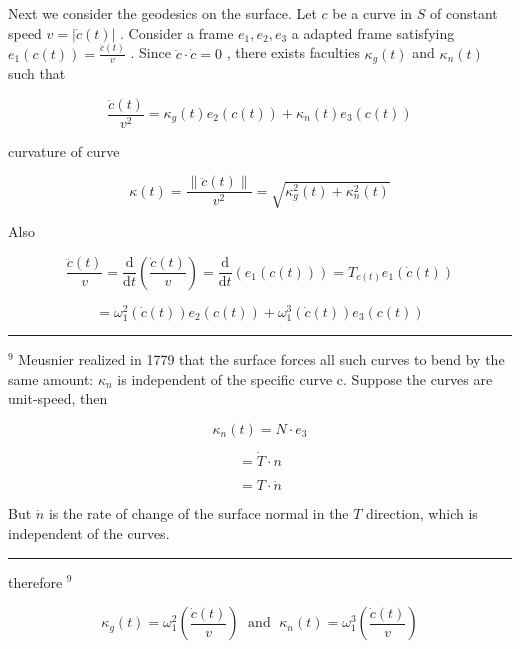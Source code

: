 \documentclass[lang=cn,a4paper,11pt,openany,twoside]{elegantbook}
\newcommand{\HRule}{\begin{center}\rule{0.9\linewidth}{0.2mm}\end{center}}
\begin{document}
Next we consider the geodesics on the surface. Let \(c\) be a curve in \(S\) of constant speed \(v = \left| {\dot{c}\left( t\right) }\right|\) . Consider a frame \({e}_{1},{e}_{2},{e}_{3}\) a adapted frame satisfying \({e}_{1}\left( {c\left( t\right) }\right)  = \frac{\dot{c}\left( t\right) }{v}\) . Since \(\ddot{c} \cdot  \dot{c} = 0\) , there exists faculties \({\kappa }_{g}\left( t\right)\) and \({\kappa }_{n}\left( t\right)\) such that

\[
\frac{\ddot{c}\left( t\right) }{{v}^{2}} = {\kappa }_{g}\left( t\right) {e}_{2}\left( {c\left( t\right) }\right)  + {\kappa }_{n}\left( t\right) {e}_{3}\left( {c\left( t\right) }\right)
\]

curvature of curve

\[
\kappa \left( t\right)  = \frac{\parallel \ddot{c}\left( t\right) \parallel }{{v}^{2}} = \sqrt{{\kappa }_{g}^{2}\left( t\right)  + {\kappa }_{n}^{2}\left( t\right) }
\]

Also

\[
\frac{\ddot{c}\left( t\right) }{v} = \frac{\mathrm{d}}{\mathrm{d}t}\left( \frac{\dot{c}\left( t\right) }{v}\right)  = \frac{\mathrm{d}}{\mathrm{d}t}\left( {{e}_{1}\left( {c\left( t\right) }\right) }\right)  = {T}_{c\left( t\right) }{e}_{1}\left( {\dot{c}\left( t\right) }\right)
\]

\[
= {\omega }_{1}^{2}\left( {\dot{c}\left( t\right) }\right) {e}_{2}\left( {c\left( t\right) }\right)  + {\omega }_{1}^{3}\left( {\dot{c}\left( t\right) }\right) {e}_{3}\left( {c\left( t\right) }\right)
\]

\HRule

\({}^{9}\) Meusnier realized in 1779 that the surface forces all such curves to bend by the same amount: \({\kappa }_{n}\) is independent of the specific curve c. Suppose the curves are unit-speed, then

\[
{\kappa }_{n}\left( t\right)  = N \cdot  {e}_{3}
\]

\[
= \dot{T} \cdot  n
\]

\[
= T \cdot  \dot{n}
\]

But \(\dot{n}\) is the rate of change of the surface normal in the \(T\) direction, which is independent of the curves.

\HRule

therefore \({}^{9}\)

\[
{\kappa }_{g}\left( t\right)  = {\omega }_{1}^{2}\left( \frac{\dot{c}\left( t\right) }{v}\right) \;\text{ and }\;{\kappa }_{n}\left( t\right)  = {\omega }_{1}^{3}\left( \frac{\dot{c}\left( t\right) }{v}\right)
\]
\end{document}
